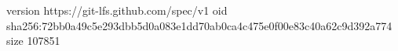 version https://git-lfs.github.com/spec/v1
oid sha256:72bb0a49c5e293dbb5d0a083e1dd70ab0ca4c475e0f00e83c40a62c9d392a774
size 107851
